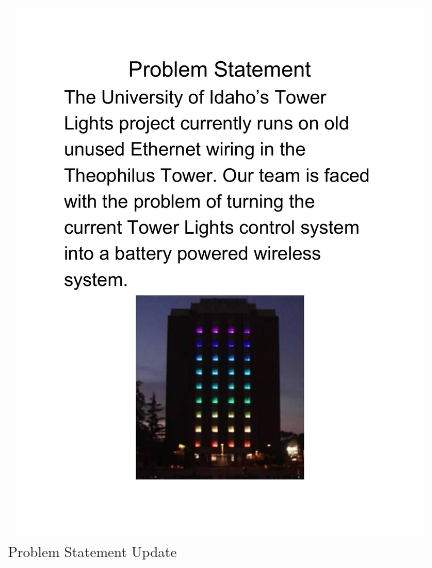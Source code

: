 \documentclass[12pt]{article}
\begin{document}
{{		\begin{figure}[!htb]
			\centering
			\includegraphics[width = 120mm, height = 140mm]{assets/2_Problem_Statement_Update.pdf}
			\caption{Problem Statement Update \label{overflow}}
		\end{figure}
		\clearpage

	
}}
\end{document}
